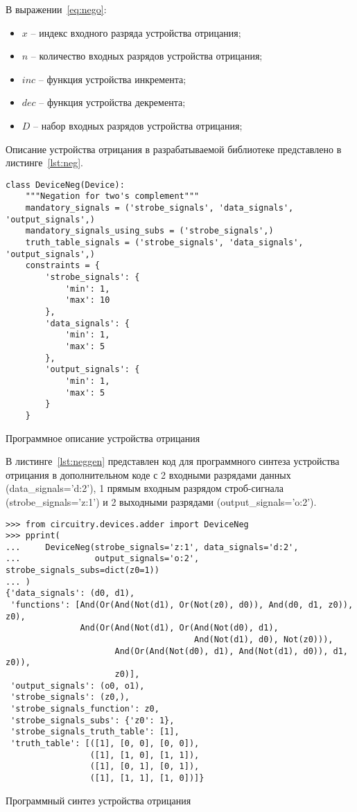 \documentclass[document.tex]{subfiles}
\begin{document}
В выражении~\ref{eq:nego}:
\begin{itemize}[noitemsep]
  \item $x$ -- индекс входного разряда устройства отрицания;
  \item $n$ -- количество входных разрядов устройства отрицания;
  \item $inc$ -- функция устройства инкремента;
  \item $dec$ -- функция устройства декремента;
  \item $D$ -- набор входных разрядов устройства отрицания;
\end{itemize}

\clearpage

Описание устройства отрицания в разрабатываемой библиотеке представлено в
листинге~\ref{lst:neg}.

\begin{listing}[ht]
\begin{verbatim}
class DeviceNeg(Device):
    """Negation for two's complement"""
    mandatory_signals = ('strobe_signals', 'data_signals', 'output_signals',)
    mandatory_signals_using_subs = ('strobe_signals',)
    truth_table_signals = ('strobe_signals', 'data_signals', 'output_signals',)
    constraints = {
        'strobe_signals': {
            'min': 1,
            'max': 10
        },
        'data_signals': {
            'min': 1,
            'max': 5
        },
        'output_signals': {
            'min': 1,
            'max': 5
        }
    }
\end{verbatim}
\caption{Программное описание устройства отрицания}
\label{lst:neg}
\end{listing}

\clearpage
В листинге~\ref{lst:neggen} представлен код для программного синтеза
устройства отрицания в дополнительном коде с 2 входными разрядами данных
(data\_signals='d:2'), 1 прямым входным разрядом строб-сигнала
(strobe\_signals='z:1') и 2 выходными разрядами (output\_signals='o:2').

\begin{listing}[ht]
\begin{verbatim}
>>> from circuitry.devices.adder import DeviceNeg          
>>> pprint(                                                
...     DeviceNeg(strobe_signals='z:1', data_signals='d:2',
...               output_signals='o:2', strobe_signals_subs=dict(z0=1))
... )
{'data_signals': (d0, d1),
 'functions': [And(Or(And(Not(d1), Or(Not(z0), d0)), And(d0, d1, z0)), z0),
               And(Or(And(Not(d1), Or(And(Not(d0), d1), 
                                      And(Not(d1), d0), Not(z0))), 
                      And(Or(And(Not(d0), d1), And(Not(d1), d0)), d1, z0)), 
                      z0)], 
 'output_signals': (o0, o1),
 'strobe_signals': (z0,),
 'strobe_signals_function': z0,
 'strobe_signals_subs': {'z0': 1},
 'strobe_signals_truth_table': [1],
 'truth_table': [([1], [0, 0], [0, 0]),
                 ([1], [1, 0], [1, 1]),
                 ([1], [0, 1], [0, 1]),
                 ([1], [1, 1], [1, 0])]}
\end{verbatim}
\caption{Программный синтез устройства отрицания}
\label{lst:neggen}
\end{listing}
\end{document}
